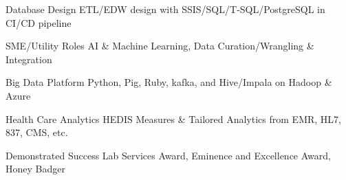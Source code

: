 

\begin{cvskills}

  \cvskill
    {Database Design} %
    {ETL/EDW design with SSIS/SQL/T‑SQL/PostgreSQL in CI/CD pipeline} %

  \cvskill
    {SME/Utility Roles} %
    {AI \& Machine Learning, Data Curation/Wrangling \& Integration} %

  \cvskill
    {Big Data Platform} %
    {Python, Pig, Ruby, kafka, and Hive/Impala on Hadoop \& Azure} %

  \cvskill
    {Health Care Analytics} %
    {HEDIS Measures \& Tailored Analytics from EMR, HL7, 837, CMS, etc.}

  \cvskill
    {Demonstrated Success} %
    {Lab Services Award, Eminence and Excellence Award, Honey Badger} %

\end{cvskills}




